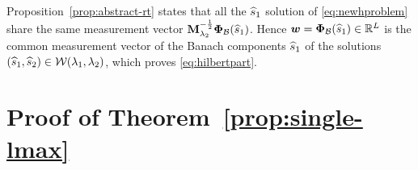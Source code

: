 
    Proposition~\ref{prop:abstract-rt} states that all the $\widehat{s}_1$ solution of \eqref{eq:newhproblem} share the same measurement vector $\mathbf{M}_{\lambda_{2}}^{-\frac{1}{2}} \bm{\Phi}_\mathcal{B} (\widehat{s}_1)$. Hence $\bm{w} = \bm{\Phi}_\mathcal{B}(\widehat{s}_1) \in \mathbb{R}^L$ is the common measurement vector of the Banach components $\widehat{s}_1$ of the solutions $(\widehat{s}_1 , \widehat{s}_2) \in \mathcal{W} (\lambda_{1},\lambda_{2})$, which proves \eqref{eq:hilbertpart}.

    

\section{Proof of Theorem~\ref{prop:single-lmax}}
\label{app:proof:2}

